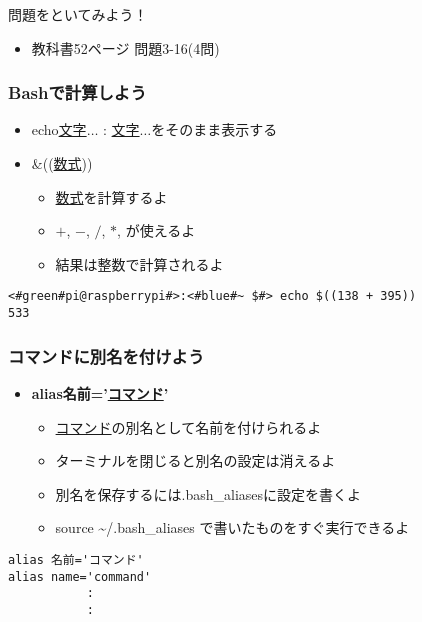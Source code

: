 \begin{frame}
    \begin{exampleblock}{問題をといてみよう！}
        \begin{itemize}
            \item 教科書52ページ 問題3-16(4問)
        \end{itemize}
    \end{exampleblock} 
\end{frame}

\begin{frame}[fragile]
    \frametitle{Bashで計算しよう}
    \begin{itemize}
        \item echo\textvisiblespace\underline{文字}$\ldots$ : \underline{文字}$\ldots$をそのまま表示する
        \item \&((\underline{数式}))
        \begin{itemize}
            \small
            \item \underline{数式}を計算するよ
            \item $+$, $-$, $/$, $*$, が使えるよ 
            \item 結果は整数で計算されるよ
        \end{itemize}
    \end{itemize}
    \begin{lstlisting}[title=echo コマンドでの計算, label=cmdsbs:calc]
<#green#pi@raspberrypi#>:<#blue#~ $#> echo $((138 + 395))
533
    \end{lstlisting}
\end{frame}

\begin{frame}[fragile]
    \frametitle{コマンドに別名を付けよう}
    \begin{itemize}
        \item {\bf alias\textvisiblespace 名前='\underline{コマンド}'}
        \begin{itemize}
            \small
            \item \underline{コマンド}の別名として名前を付けられるよ
            \item ターミナルを閉じると別名の設定は消えるよ
            \item 別名を保存するには.bash\_aliasesに設定を書くよ
            \item source \sim/.bash\_aliases で書いたものをすぐ実行できるよ
        \end{itemize}
    \end{itemize}
    \begin{lstlisting}[title=\textasciitilde/.bash\_aliasesの書き方, label=bashAliasesGrammar1]
alias 名前='コマンド'
alias name='command'
           :
           :
    \end{lstlisting}
\end{frame}

